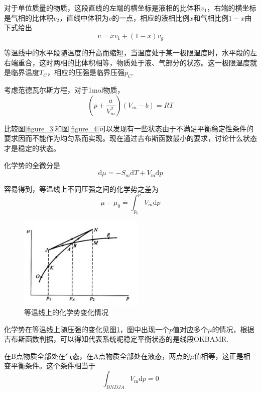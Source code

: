 \documentclass[UTF8]{ctexart}
\begin{document}
	对于单位质量的物质，这段直线的左端的横坐标是液相的比体积$ v_{1} $，右端的横坐标是气相的比体积$ v_{2} $，直线中体积为$ v $的一点，相应的液相比例$ x $和气相比例$ 1-x $由下式给出
	\begin{equation}
	v=x v_{1}+(1-x) v_{g}
	\end{equation}
	
	等温线中的水平段随温度的升高而缩短，当温度处于某一极限温度时，水平段的左右端重合，这时两相的比体积相等，物质处于液、气部分的状态。这一极限温度就是临界温度$ T_{C} $，相应的压强是临界压强$ p_{C} $.
	
	考虑范德瓦尔斯方程，对于1mol物质，
	\begin{equation}
	\left(p+\frac{a}{V_{m}^{2}}\right)\left(V_{m}-b\right)=R T
	\end{equation}
	

	比较图\ref{figure_3}和图\ref{figure_4}可以发现有一些状态由于不满足平衡稳定性条件的要求因而不能作为均匀系而实现。现在通过吉布斯函数最小的要求，讨论什么状态才是稳定的状态。
	
	化学势的全微分是
	\begin{equation}
	\mathrm{d} \mu=-S_{m} \mathrm{d} T+V_{\mathrm{m}} \mathrm{d} p
	\end{equation}
	
\noindent 容易得到，等温线上不同压强之间的化学势之差为
\begin{equation}
\mu-\mu_{0}=\int_{p_{0}}^{p} V_{m} \mathrm{d} p
\end{equation}

	\begin{figure}
		\includegraphics[width=6cm]{Ther_huaxueshi.png}
		\caption{等温线上的化学势变化情况}
		\label{figure_5}
	\end{figure}

	化学势在等温线上随压强的变化见图\ref{figure_5}，图中出现一个$ p $值对应多个$ \mu $的情况，根据吉布斯函数判据，可以得知代表系统呢稳定平衡状态的是线段OKBAMR.
	
	在B点物质全部处在气态，在A点物质全部处在液态，两点的$ \mu $值相等，这正是相变平衡条件。这个条件相当于
	\begin{equation}
	\int_{B N D J A} V_{\mathrm{m}} \mathrm{d} p=0
	\end{equation}
	
\end{document}
